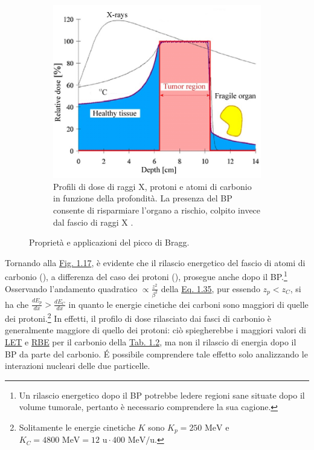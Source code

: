 \documentclass[12pt,a4paper,twoside]{report}
\begin{document}
\begin{figure}[H]
\begin{subfigure}[t]{0.49\textwidth}
			\label{fig:sobp}
		\end{subfigure}
		\par
		\begin{subfigure}[t]{0.49\textwidth}
			\centering
			\includegraphics[width=\textwidth, scale=0.50]{critical_organ.jpg}
			\caption{Profili di dose di raggi X, protoni e atomi di carbonio in funzione della profondità. La presenza del BP consente di risparmiare l'organo a rischio, colpito invece dal fascio di raggi X \cite{unipv_conference2}.}
			\label{fig:critical_organ}
		\end{subfigure}
		\caption{Proprietà e applicazioni del picco di Bragg.}
	\end{figure}
	Tornando alla \hyperref[fig:photon]{Fig. 1.17}, è evidente che il rilascio energetico del fascio di atomi di carbonio (), a differenza del caso dei protoni (), prosegue anche dopo il BP.\footnote{Un rilascio energetico dopo il BP potrebbe ledere regioni sane situate dopo il volume tumorale, pertanto è necessario comprendere la sua cagione.} Osservando l'andamento quadratico $\propto\frac{z^2}{\beta^2}$ della \hyperref[eq:bethe_bloch]{Eq. 1.35}, pur essendo $z_p<z_C$, si ha che $\frac{dE_p}{dx}>\frac{dE_C}{dx}$ in quanto le energie cinetiche dei carboni sono maggiori di quelle dei protoni.\footnote{Solitamente le energie cinetiche $K$ sono $K_p=250 \mbox{ MeV}$ e $K_C=4800\mbox{ MeV}=12\mbox{ u}\cdot400\mbox{ MeV/u}$.} In effetti, il profilo di dose rilasciato dai fasci di carbonio è generalmente maggiore di quello dei protoni: ciò spiegherebbe i maggiori valori di \hyperref[par:let]{LET} e \hyperref[par:rbe]{RBE} per il carbonio della \hyperref[tab:let_rbe]{Tab. 1.2}, ma non il rilascio di energia dopo il BP da parte del carbonio. \'E possibile comprendere tale effetto solo analizzando le interazioni nucleari delle due particelle.
	
\end{document}
